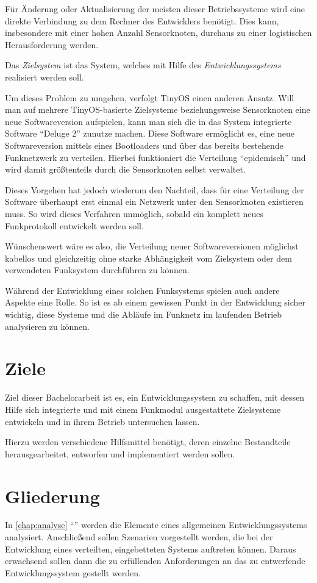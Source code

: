 Für Änderung oder Aktualisierung der meisten dieser Betriebssysteme
wird eine direkte Verbindung zu dem Rechner des Entwicklers benötigt. Dies kann,
insbesondere mit einer hohen Anzahl Sensorknoten, durchaus zu einer logistischen
Herausforderung werden.

\begin{definition}[Zielsystem]
Das \emph{Zielsystem} ist das System, welches mit Hilfe des
\emph{Entwicklungssystems} realisiert werden soll.
\end{definition}

Um dieses Problem zu umgehen, verfolgt TinyOS einen anderen Ansatz. Will man auf
mehrere TinyOS-basierte Zielsysteme beziehungsweise Sensorknoten eine neue
Softwareversion aufspielen, kann man sich die in das System integrierte Software
"`Deluge 2"'\cite{DELUG} zunutze machen. Diese Software ermöglicht es, eine neue
Softwareversion mittels eines Bootloaders und über das bereits bestehende
Funknetzwerk zu verteilen. Hierbei funktioniert die Verteilung "`epidemisch"'
und wird damit größtenteils durch die Sensorknoten selbst verwaltet.

Dieses Vorgehen hat jedoch wiederum den Nachteil, dass für eine Verteilung der
Software überhaupt erst einmal ein Netzwerk unter den Sensorknoten existieren
muss. So wird dieses Verfahren unmöglich, sobald ein komplett neues
Funkprotokoll entwickelt werden soll.

Wünschenswert wäre es also, die Verteilung neuer Softwareversionen möglichst
kabellos und gleichzeitig ohne starke Abhängigkeit vom Zielsystem oder dem
verwendeten Funksystem durchführen zu können.

Während der Entwicklung eines solchen Funksystems spielen auch andere
Aspekte eine Rolle. So ist es ab einem gewissen Punkt in der Entwicklung sicher
wichtig, diese Systeme und die Abläufe im Funknetz im laufenden Betrieb
analysieren zu können.

\section{Ziele}
Ziel dieser Bachelorarbeit ist es, ein Entwicklungssystem zu schaffen,
mit dessen Hilfe sich integrierte und mit einem Funkmodul ausgestattete
Zielsysteme entwickeln und in ihrem Betrieb untersuchen lassen.

Hierzu werden verschiedene Hilfsmittel benötigt, deren einzelne Bestandteile
herausgearbeitet, entworfen und implementiert werden sollen.
\section{Gliederung}
In \autoref{chap:analyse} "`"' werden die Elemente eines
allgemeinen Entwicklungssystems analysiert. Anschließend sollen Szenarien
vorgestellt werden, die bei der Entwicklung eines verteilten,
eingebetteten Systems auftreten können. Daraus erwachsend sollen
dann die zu erfüllenden Anforderungen an das zu entwerfende
Entwicklungssystem gestellt werden.

